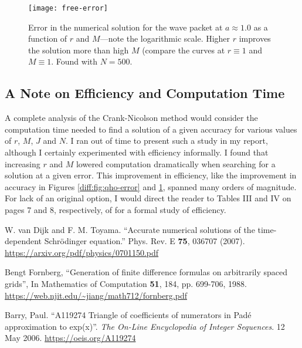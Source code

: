 \documentclass[11pt, a4paper]{article}
\newcommand{\schro}{Schr\"{o}dinger\xspace}
\begin{document}
\begin{figure}[htb!]
\centering
\texttt{[image: free-error]}
\caption{Error in the numerical solution for the wave packet at $ a \approx 1.0 $ as a function of $ r $ and $ M $---note the logarithmic scale. Higher $ r $ improves the solution more than high $ M $ (compare the curves at $ r \equiv 1$ and $ M \equiv 1 $. Found with $ N = 500 $.}
\label{diff:fig:free-error}
\end{figure}


\subsection{A Note on Efficiency and Computation Time}
A complete analysis of the Crank-Nicolson method would consider the computation time needed to find a solution of a given accuracy for various values of $ r $, $ M $, $ J $ and $ N $. I ran out of time to present such a study in my report, although I certainly experimented with efficiency informally. I found that increasing $ r $ and $ M $ lowered computation dramatically when searching for a solution at a given error. This improvement in efficiency, like the improvement in accuracy in Figures \ref{diff:fig:qho-error} and \ref{diff:fig:free-error}, spanned many orders of magnitude. For lack of an original option, I would direct the reader to Tables III and IV on pages 7 and 8, respectively, of \cite{vandijk} for a formal study of efficiency.

\begin{thebibliography}{}
\setlength{\itemsep}{.2\itemsep} \setlength{\parsep}{.5\parsep}

 W. van Dijk and F. M. Toyama. ``Accurate numerical solutions of the time-dependent \schro equation.'' Phys. Rev. E \textbf{75}, 036707 (2007). \url{https://arxiv.org/pdf/physics/0701150.pdf}

Bengt Fornberg, ``Generation of finite difference formulas on arbitrarily spaced grids'', In Mathematics of Computation \textbf{51}, 184, pp. 699-706, 1988. \url{https://web.njit.edu/~jiang/math712/fornberg.pdf}

 Barry, Paul. ``A119274 Triangle of coefficients of numerators in Pad\'{e} approximation to exp(x)''. \textit{The On-Line Encyclopedia of Integer Sequences}. 12 May 2006. \url{https://oeis.org/A119274}


\end{thebibliography}
\end{document}
